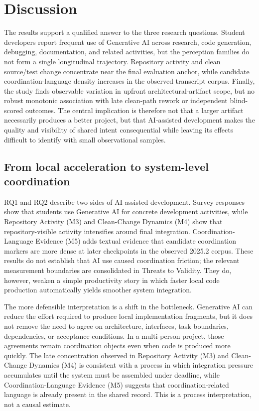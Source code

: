 \section{Discussion}
The results support a qualified answer to the three research questions. Student
developers report frequent use of Generative AI across research, code
generation, debugging, documentation, and related activities, but the
perception families do not form a single longitudinal trajectory. Repository
activity and clean source/test change concentrate near the final evaluation
anchor, while candidate coordination-language density increases in the
observed transcript corpus. Finally, the study finds observable variation in
upfront architectural-artifact scope, but no robust monotonic association with
late clean-path rework or independent blind-scored outcomes. The central
implication is therefore not that a larger artifact necessarily produces a
better project, but that AI-assisted development makes the quality and
visibility of shared intent consequential while leaving its effects difficult
to identify with small observational samples.

\subsection{From local acceleration to system-level coordination}

RQ1 and RQ2 describe two sides of AI-assisted development. Survey responses
show that students use Generative AI for concrete development activities, while
Repository Activity (M3) and Clean-Change Dynamics (M4) show that
repository-visible activity intensifies around final integration.
Coordination-Language Evidence (M5) adds textual evidence that candidate
coordination markers are
more dense at later checkpoints in the observed 2025.2 corpus. These results do
not establish that AI use caused coordination friction; the relevant
measurement boundaries are consolidated in Threats to Validity. They do,
however, weaken a simple productivity story in which faster local code
production automatically yields smoother system integration.

The more defensible interpretation is a shift in the bottleneck. Generative AI
can reduce the effort required to produce local implementation fragments, but
it does not remove the need to agree on architecture, interfaces, task
boundaries, dependencies, or acceptance conditions. In a multi-person project,
those agreements remain coordination objects even when code is produced more
quickly. The late concentration observed in Repository Activity (M3) and
Clean-Change Dynamics (M4) is consistent with a process
in which integration pressure accumulates until the system must be assembled
under deadline, while Coordination-Language Evidence (M5) suggests that
coordination-related language is already
present in the shared record. This is a process interpretation, not a causal
estimate.

